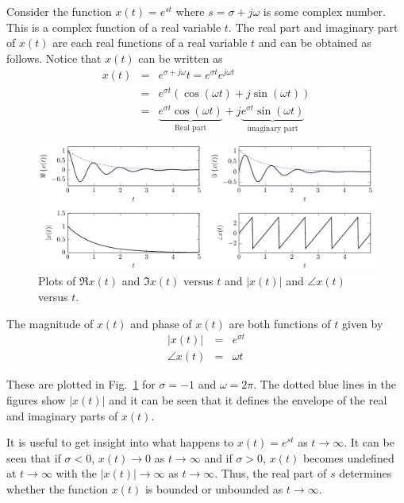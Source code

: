 \begin{example}
Consider the function $x(t) = e^{st}$ where $s = \sigma + j \omega$ is some complex number. This is a complex function of a real variable $t$. The real part and imaginary part of $x(t)$ are each real functions of a real variable $t$ and can be obtained as follows. Notice that $x(t)$ can be written as
\begin{eqnarray*}
  x(t) &=& e^{\sigma+j\omega}t = e^{\sigma t} e^{j \omega t} \\
   &=& e^{\sigma t} \left(\cos(\omega t) + j \sin(\omega t) \right) \\
   &=& \underbrace{e^{\sigma t} \cos(\omega t)}_{\text{Real part}} + j \underbrace{e^{\sigma t} \sin(\omega t)}_{\text{imaginary part}}
\end{eqnarray*}
\begin{figure}[htbp]
\begin{center}\includegraphics[width=6.0in]{../Images/ComplexNumbers/Fig_complexexponential.pdf}\end{center}
\caption{Plots of $\Re{x(t)}$ and $\Im{x(t)}$ versus $t$ and $|x(t)|$ and $\angle x(t)$ versus $t$.}
\label{fig:complexexponential}
\end{figure}
\end{example}
The magnitude of $x(t)$ and phase of $x(t)$ are both functions of $t$ given by
\begin{eqnarray*}
  |x(t)| &=& e^{\sigma t} \\
  \angle x(t) &=& \omega t
\end{eqnarray*}

These are plotted in Fig.~\ref{fig:complexexponential} for $\sigma = -1$ and $\omega = 2 \pi$.
The dotted blue lines in the figures show $|x(t)|$ and it can be seen that it defines the envelope of the real and imaginary
parts of $x(t)$.

It is useful to get insight into what happens to $x(t) = e^{st}$ as $t \rightarrow \infty$.
It can be seen that if $\sigma < 0$, $x(t) \rightarrow 0$ as $t \rightarrow \infty$ and if $\sigma > 0$, $x(t)$ becomes undefined at $t \rightarrow \infty$ with the $|x(t)| \rightarrow \infty$ as $t \rightarrow \infty$.
Thus, the real part of $s$ determines whether the function $x(t)$ is bounded or unbounded as $t \rightarrow \infty$.


